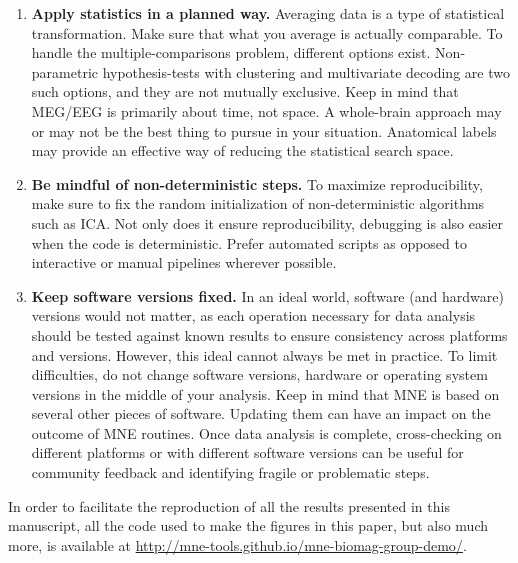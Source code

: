 \begin{enumerate}
\item \textbf{Apply statistics in a planned way.} Averaging data is a type of statistical transformation. Make sure that what you average is actually comparable. To handle the multiple-comparisons problem, different 
options exist. Non-parametric hypothesis-tests with clustering and multivariate decoding are two such options, and they are not mutually exclusive. Keep in mind that \ac{MEG}/\ac{EEG} is primarily about time, not space. A whole-brain approach may or may not be the best thing to pursue in your situation. Anatomical labels may provide an effective way of reducing the statistical search space.

\item \textbf{Be mindful of non-deterministic steps.} To maximize reproducibility, make sure to fix the random initialization of non-deterministic algorithms such as ICA. Not only does it ensure reproducibility, debugging is also easier when the code is deterministic. Prefer automated scripts as opposed to interactive or manual pipelines wherever possible.

\item \textbf{Keep software versions fixed.} In an ideal world, software (and hardware) versions would not matter, as each operation necessary for data analysis should be tested against known results to ensure consistency across platforms and versions. However, this ideal cannot always be met in practice. To limit difficulties, do not change software versions, hardware or operating system versions in the middle of your analysis. Keep in mind that MNE is based on several other pieces of software. Updating them can have an impact on the outcome of MNE routines. Once data analysis is complete, cross-checking on different platforms or with different software versions can be useful for community feedback and identifying fragile or problematic steps.

\end{enumerate}

In order to facilitate the reproduction of all the results presented in this manuscript, all the code used to make the figures in this paper, but also much more, is available at \url{http://mne-tools.github.io/mne-biomag-group-demo/}.
